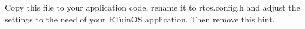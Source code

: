 
\begin{DoxyRefList}
\item[\label{todo__todo000001}%
\hypertarget{todo__todo000001}{}%
File \hyperlink{rtos_8config_8template_8h}{rtos.config.template.h} ]Copy this file to your application code, rename it to rtos.\-config.\-h and adjust the settings to the need of your R\-Tuin\-O\-S application. Then remove this hint.
\end{DoxyRefList}